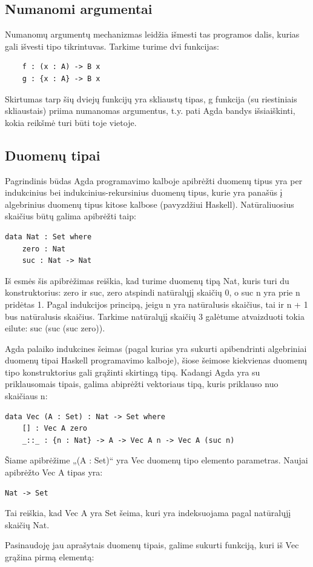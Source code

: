 \documentclass{VUMIFPSkursinis}
\begin{document}
\subsection{Numanomi argumentai}
Numanomų argumentų mechanizmas leidžia išmesti tas programos dalis, kurias gali išvesti tipo tikrintuvas. Tarkime turime dvi funkcijas:
\begin{lstlisting}
	f : (x : A) -> B x
	g : {x : A} -> B x
\end{lstlisting}
Skirtumas tarp šių dviejų funkcijų yra skliaustų tipas, g funkcija (su riestiniais skliaustais) priima numanomas argumentus, t.y. pati Agda bandys išsiaiškinti, kokia reikšmė turi būti toje vietoje.
\subsection{Duomenų tipai}
Pagrindinis būdas Agda programavimo kalboje apibrėžti duomenų tipus yra per indukcinius bei indukcinius-rekursinius duomenų tipus, kurie yra panašūs į algebrinius duomenų tipus kitose kalbose (pavyzdžiui Haskell). Natūraliuosius  skaičius būtų galima apibrėžti taip:
\begin{lstlisting}
data Nat : Set where
	zero : Nat
	suc : Nat -> Nat
\end{lstlisting}
Iš esmės šis apibrėžimas reiškia, kad turime duomenų tipą Nat, kuris turi du konstruktorius: zero ir suc, zero atspindi natūralųjį skaičių 0, o suc n yra prie n pridėtas 1. Pagal indukcijos principą, jeigu n yra natūralusis skaičius, tai ir n + 1 bus natūralusis skaičius. Tarkime natūralųjį skaičių 3 galėtume atvaizduoti tokia eilute: suc (suc (suc zero)).\par Agda palaiko indukcines šeimas (pagal kurias yra sukurti apibendrinti algebriniai duomenų tipai Haskell programavimo kalboje), šiose šeimose kiekvienas duomenų tipo konstruktorius gali grąžinti skirtingą tipą. Kadangi Agda yra su priklausomais tipais, galima abiprėžti vektoriaus tipą, kuris priklauso nuo skaičiaus n:
\begin{lstlisting}
data Vec (A : Set) : Nat -> Set where
	[] : Vec A zero
	_::_ : {n : Nat} -> A -> Vec A n -> Vec A (suc n)
\end{lstlisting}
Šiame apibrėžime „(A : Set)“ yra Vec duomenų tipo elemento parametras. Naujai apibrėžto Vec A tipas yra:
\begin{lstlisting}
Nat -> Set
\end{lstlisting}
Tai reiškia, kad Vec A yra Set šeima, kuri yra indeksuojama pagal natūralųjį skaičių Nat.
\par Pasinaudoję jau aprašytais duomenų tipais, galime sukurti funkciją, kuri iš Vec grąžina pirmą elementą:
\end{document}
